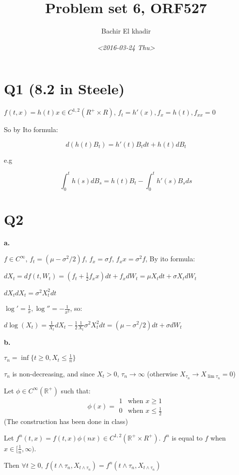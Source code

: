 \documentclass[11pt]{article}
\author{Bachir El khadir}
\date{\textit{<2016-03-24 Thu>}}
\title{Problem set 6, ORF527}
\begin{document}
\maketitle

\section{Q1 (8.2 in Steele)}
\label{sec:orgheadline1}

\(f(t, x) = h(t)x \in C^{1,2}(R^+ \times R)\), \(f_t = h'(x), f_x = h(t), f_{xx} = 0\)

So by Ito formula:

$$d(h(t)B_t) = h'(t)B_t dt + h(t)dB_t$$

e.g

$$\int_0^t h(s) dB_s = h(t)B_t - \int_0^t h'(s)B_sds$$

\section{Q2}
\label{sec:orgheadline2}
\textbf{a.}

\(f \in C^{\infty}\), \(f_t = (\mu - \sigma^2/2)f\), \(f_x = \sigma f\), \(f_xx = \sigma^2 f\), By ito formula:

\(dX_t = df(t, W_t) = (f_t + \frac12 f_xx) dt + f_x dW_t = \mu X_t dt + \sigma X_t dW_t\)

\(dX_tdX_t = \sigma^2 X_t^2 dt\)

\(\log' = \frac1x, \log'' = -\frac1{x^2}\), so:

\(d\log(X_t) = \frac{1}{X_t} dX_t - \frac12 \frac1{X_t} \sigma^2 X_t^2 dt = (\mu - \sigma^2/2)dt + \sigma dW_t\)

\textbf{b.}

\(\tau_n = \inf \{ t \ge 0, X_t \le \frac1n \}\)

\(\tau_n\) is non-decreasing, and since \(X_t > 0\), \(\tau_n \rightarrow \infty\) (otherwise \(X_{\tau_n} \rightarrow X_{\lim \tau_n} = 0\))

Let  \(\phi \in C^{\infty}(\mathbb R^+)\) such that:
\[\phi(x) = \begin{array}{cc}
  1 & \text{when } x \ge 1\\
  0 & \text{when } x \le \frac12
  \end{array}
  \]
(The construction has been done in class)

Let \(f^n(t, x) = f(t, x)\phi(nx) \in C^{1, 2}(\mathbb R^+ \times R^+)\). \(f^n\) is equal to \(f\) when \(x \in[\frac1n, \infty)\). 

Then \(\forall t \ge 0\), \(f(t \wedge \tau_n, X_{t \wedge \tau_n}) = f^n(t \wedge \tau_n, X_{t \wedge \tau_n})\)
\end{document}
